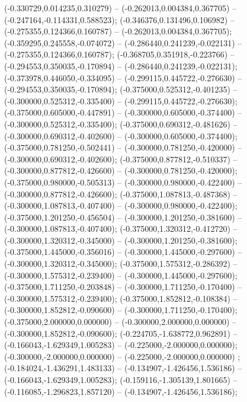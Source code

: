  (-0.330729,0.014235,0.310279) -- (-0.262013,0.004384,0.367705) -- (-0.247164,-0.114331,0.588523);
 (-0.346376,0.131496,0.106982) -- (-0.275355,0.124366,0.160787) -- (-0.262013,0.004384,0.367705);
 (-0.359295,0.245558,-0.074072) -- (-0.286440,0.241239,-0.022131) -- (-0.275355,0.124366,0.160787);
 (-0.368705,0.351918,-0.223766) -- (-0.294553,0.350035,-0.170894) -- (-0.286440,0.241239,-0.022131);
 (-0.373978,0.446050,-0.334095) -- (-0.299115,0.445722,-0.276630) -- (-0.294553,0.350035,-0.170894);
 (-0.375000,0.525312,-0.401235) -- (-0.300000,0.525312,-0.335400) -- (-0.299115,0.445722,-0.276630);
 (-0.375000,0.605000,-0.447891) -- (-0.300000,0.605000,-0.374400) -- (-0.300000,0.525312,-0.335400);
 (-0.375000,0.690312,-0.481626) -- (-0.300000,0.690312,-0.402600) -- (-0.300000,0.605000,-0.374400);
 (-0.375000,0.781250,-0.502441) -- (-0.300000,0.781250,-0.420000) -- (-0.300000,0.690312,-0.402600);
 (-0.375000,0.877812,-0.510337) -- (-0.300000,0.877812,-0.426600) -- (-0.300000,0.781250,-0.420000);
 (-0.375000,0.980000,-0.505313) -- (-0.300000,0.980000,-0.422400) -- (-0.300000,0.877812,-0.426600);
 (-0.375000,1.087813,-0.487368) -- (-0.300000,1.087813,-0.407400) -- (-0.300000,0.980000,-0.422400);
 (-0.375000,1.201250,-0.456504) -- (-0.300000,1.201250,-0.381600) -- (-0.300000,1.087813,-0.407400);
 (-0.375000,1.320312,-0.412720) -- (-0.300000,1.320312,-0.345000) -- (-0.300000,1.201250,-0.381600);
 (-0.375000,1.445000,-0.356016) -- (-0.300000,1.445000,-0.297600) -- (-0.300000,1.320312,-0.345000);
 (-0.375000,1.575312,-0.286392) -- (-0.300000,1.575312,-0.239400) -- (-0.300000,1.445000,-0.297600);
 (-0.375000,1.711250,-0.203848) -- (-0.300000,1.711250,-0.170400) -- (-0.300000,1.575312,-0.239400);
 (-0.375000,1.852812,-0.108384) -- (-0.300000,1.852812,-0.090600) -- (-0.300000,1.711250,-0.170400);
 (-0.375000,2.000000,0.000000) -- (-0.300000,2.000000,0.000000) -- (-0.300000,1.852812,-0.090600);
 (-0.224705,-1.638772,0.962891) -- (-0.166043,-1.629349,1.005283) -- (-0.225000,-2.000000,0.000000);
 (-0.300000,-2.000000,0.000000) -- (-0.225000,-2.000000,0.000000) ;
 (-0.184024,-1.436291,1.483133) -- (-0.134907,-1.426456,1.536186) -- (-0.166043,-1.629349,1.005283);
 (-0.159116,-1.305139,1.801665) -- (-0.116085,-1.296823,1.857120) -- (-0.134907,-1.426456,1.536186);
